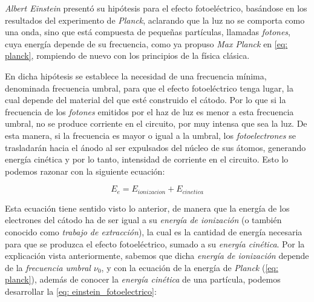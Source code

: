 \documentclass{article}
\begin{document}
    \vspace{5mm}

    \textit{Albert Einstein} presentó su hipótesis para el efecto fotoeléctrico, basándose en los resultados del experimento de \textit{Planck}, aclarando que la luz no se comporta como una onda, sino que está compuesta de pequeñas partículas, llamadas \textit{fotones}, cuya energía depende de su frecuencia, como ya propuso \textit{Max Planck} en \autoref{eq: planck}, rompiendo de nuevo con los principios de la física clásica.

    \vspace{5mm}

    En dicha hipótesis se establece la necesidad de una frecuencia mínima, denominada frecuencia umbral, para que el efecto fotoeléctrico tenga lugar, la cual depende del material del que esté construido el cátodo. Por lo que si la frecuencia de los \textit{fotones} emitidos por el haz de luz es menor a esta frecuencia umbral, no se produce corriente en el circuito, por muy intensa que sea la luz. De esta manera, si la frecuencia es mayor o igual a la umbral, los \textit{fotoelectrones} se trasladarán hacia el ánodo al ser expulsados del núcleo de sus átomos, generando energía cinética y por lo tanto, intensidad de corriente en el circuito. Esto lo podemos razonar con la siguiente ecuación:

    \vspace{5mm}

    \begin{equation}
        E_e = E_{ionizacion} + E_{cinetica}
        \label{eq: einstein_fotoelectrico}
    \end{equation}

    \vspace{5mm}

    Esta ecuación tiene sentido visto lo anterior, de manera que la energía de los electrones del cátodo ha de ser igual a su \textit{energía de ionización} (o también conocido como \textit{trabajo de extracción}), la cual es la cantidad de energía necesaria para que se produzca el efecto fotoeléctrico, sumado a su \textit{energía cinética}. Por la explicación vista anteriormente, sabemos que dicha \textit{energía de ionización} depende de la \textit{frecuencia umbral \( \nu_{0} \)}, y con la ecuación de la energía de \textit{Planck} (\autoref{eq: planck}), además de conocer la \textit{energía cinética} de una partícula, podemos desarrollar la \autoref{eq: einstein_fotoelectrico}:

    \vspace{5mm}
\end{document}
